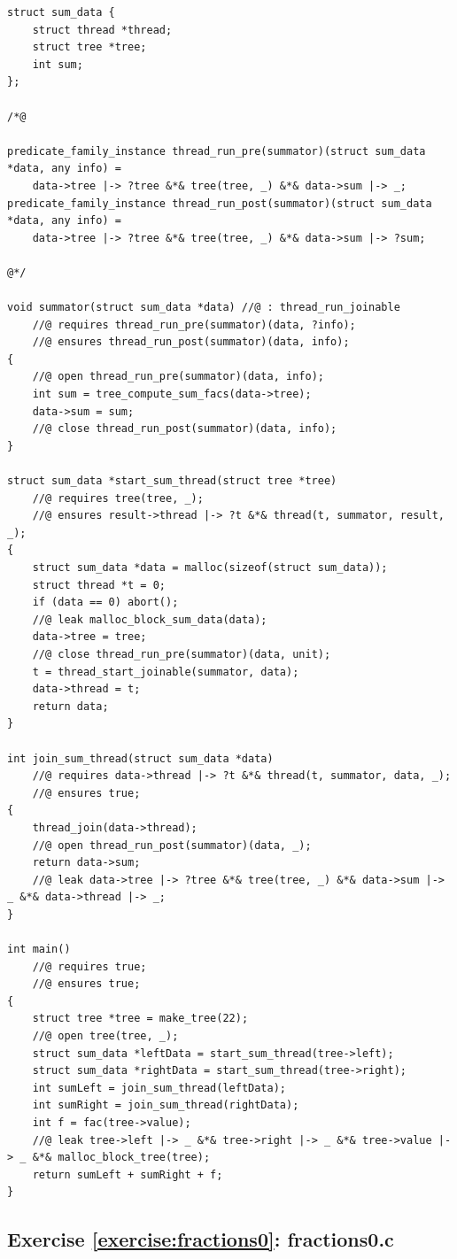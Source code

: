 \documentclass{article}
\begin{document}
\begin{lstlisting}
struct sum_data {
    struct thread *thread;
    struct tree *tree;
    int sum;
};

/*@

predicate_family_instance thread_run_pre(summator)(struct sum_data *data, any info) =
    data->tree |-> ?tree &*& tree(tree, _) &*& data->sum |-> _;
predicate_family_instance thread_run_post(summator)(struct sum_data *data, any info) =
    data->tree |-> ?tree &*& tree(tree, _) &*& data->sum |-> ?sum;

@*/

void summator(struct sum_data *data) //@ : thread_run_joinable
    //@ requires thread_run_pre(summator)(data, ?info);
    //@ ensures thread_run_post(summator)(data, info);
{
    //@ open thread_run_pre(summator)(data, info);
    int sum = tree_compute_sum_facs(data->tree);
    data->sum = sum;
    //@ close thread_run_post(summator)(data, info);
}

struct sum_data *start_sum_thread(struct tree *tree)
    //@ requires tree(tree, _);
    //@ ensures result->thread |-> ?t &*& thread(t, summator, result, _);
{
    struct sum_data *data = malloc(sizeof(struct sum_data));
    struct thread *t = 0;
    if (data == 0) abort();
    //@ leak malloc_block_sum_data(data);
    data->tree = tree;
    //@ close thread_run_pre(summator)(data, unit);
    t = thread_start_joinable(summator, data);
    data->thread = t;
    return data;
}

int join_sum_thread(struct sum_data *data)
    //@ requires data->thread |-> ?t &*& thread(t, summator, data, _);
    //@ ensures true;
{
    thread_join(data->thread);
    //@ open thread_run_post(summator)(data, _);
    return data->sum;
    //@ leak data->tree |-> ?tree &*& tree(tree, _) &*& data->sum |-> _ &*& data->thread |-> _;
}

int main()
    //@ requires true;
    //@ ensures true;
{
    struct tree *tree = make_tree(22);
    //@ open tree(tree, _);
    struct sum_data *leftData = start_sum_thread(tree->left);
    struct sum_data *rightData = start_sum_thread(tree->right);
    int sumLeft = join_sum_thread(leftData);
    int sumRight = join_sum_thread(rightData);
    int f = fac(tree->value);
    //@ leak tree->left |-> _ &*& tree->right |-> _ &*& tree->value |-> _ &*& malloc_block_tree(tree);
    return sumLeft + sumRight + f;
}
\end{lstlisting}

\subsection{Exercise \ref{exercise:fractions0}: fractions0.c}\label{solution:fractions0}
\end{document}
